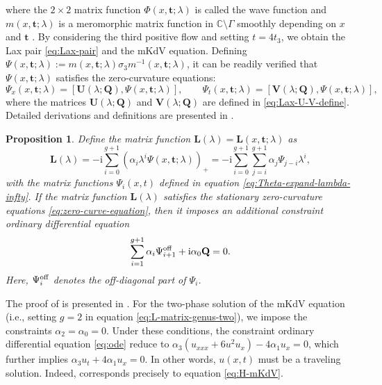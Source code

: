 \documentclass[11pt,reqno]{amsart}
\newcommand{\ii}{\mathrm{i}}
\newtheorem{prop}{Proposition}
\numberwithin{equation}{section}
\begin{document}
where the $2\times 2$ matrix function $\Phi(x,\mathbf{t};\lambda)$ is called the wave function and $m(x,\mathbf{t};\lambda)$ is a meromorphic matrix function in $\mathbb{C}\setminus \Gamma$ smoothly depending on $x$ and $\mathbf{t}$ \cite{BealsC-84,Terng-97}. 
By considering the third positive flow and setting $t=4t_3$, we obtain the Lax pair \eqref{eq:Lax-pair} and the mKdV equation. 
Defining $\Psi(x,\mathbf{t};\lambda):=m(x,\mathbf{t};\lambda)\sigma_3 m^{-1}(x,\mathbf{t};\lambda)$,
it can be readily verified that $\Psi(x,\mathbf{t};\lambda)$ satisfies the zero-curvature equations:
\begin{equation}\label{eq:zero-curve-equation}
	\Psi_x(x,\mathbf{t};\lambda)=\left[\mathbf{U}(\lambda;\mathbf{Q}), \Psi(x,\mathbf{t};\lambda)\right],\qquad
	\Psi_{t}(x,\mathbf{t};\lambda)=\left[\mathbf{V}(\lambda;\mathbf{Q}), \Psi(x,\mathbf{t};\lambda)\right],
\end{equation}
where the matrices $\mathbf{U}(\lambda;\mathbf{Q})$ and $\mathbf{V}(\lambda;\mathbf{Q})$ are defined in \eqref{eq:Lax-U-V-define}.
Detailed derivations and definitions are presented in .

 
\begin{prop}\label{prop:L-matrix}
	Define the matrix function $\mathbf{L}(\lambda)=\mathbf{L}(x,\mathbf{t};\lambda)$ as
	\begin{equation}\label{eq:L-matrix-genus-two}
		\mathbf{L}(\lambda)=-\ii \sum_{i=0}^{g+1}\left(\alpha_i\lambda^i\Psi(x,\mathbf{t};\lambda)\right)_{+}=-\ii \sum_{i=0}^{g+1}\sum_{j=i}^{g+1}\alpha_j \Psi_{j-i}\lambda^{i},
	\end{equation}
	with the matrix functions $\Psi_i(x,t)$ defined in equation \eqref{eq:Theta-expand-lambda-infty}.
	If the matrix function $\mathbf{L}(\lambda)$ satisfies the stationary zero-curvature equations \eqref{eq:zero-curve-equation},
	then it imposes an additional constraint ordinary differential equation
	\begin{equation}\label{eq:ode}
		\sum_{i=1}^{g+1}\alpha_i\Psi_{i+1}^{\rm off}+\ii\alpha_0\mathbf{Q}=0.
	\end{equation}
	Here, $\Psi_i^{\rm off}$ denotes the off-diagonal part of $\Psi_i$.
\end{prop}


The proof of  is presented in . 
For the two-phase solution of the mKdV equation (i.e., setting $g=2$ in equation \eqref{eq:L-matrix-genus-two}), we impose the constraints $\alpha_2=\alpha_0=0$. 
Under these conditions, the constraint ordinary differential equation \eqref{eq:ode} reduce to $\alpha_3(u_{xxx}+6u^2u_x)-4\alpha_1 u_x=0$, which further implies $\alpha_3 u_t+4\alpha_1 u_x=0$. 
In other words, $u(x,t)$ must be a traveling solution.
Indeed,  corresponds precisely to equation \eqref{eq:H-mKdV}. 
\end{document}

